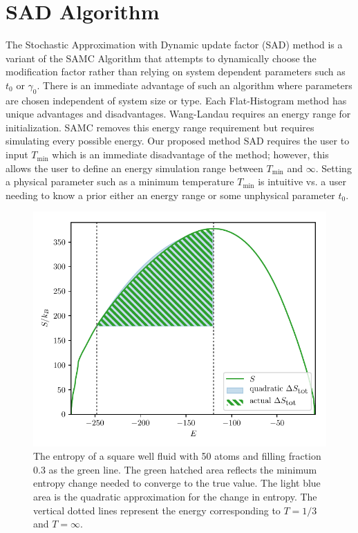 \documentclass[letterpaper,twocolumn,amsmath,amssymb,pre,aps,10pt]{revtex4-1}
\begin{document}
\section{SAD Algorithm}\label{sec:sad}
The Stochastic Approximation with Dynamic update factor (SAD) method
is a variant of the SAMC
Algorithm that attempts to dynamically choose the modification factor
rather than relying on system dependent parameters such as $t_0$ or
$\gamma_0$.  There is an immediate advantage of such an algorithm where
parameters are chosen independent of system size or type. Each
Flat-Histogram method has unique advantages and disadvantages.
Wang-Landau requires an energy range for initialization.  SAMC removes
this energy range requirement but requires simulating every possible
energy. Our proposed method SAD requires the user to input
$T_\text{min}$ which is an immediate disadvantage of the method;
however, this allows the user to define an energy simulation
range between $T_\text{min}$ and $\infty$. Setting a physical parameter
such as a minimum temperature $T_\text{min}$ is intuitive vs. a user
needing to know a prior either an energy range or some unphysical
parameter $t_0$.

\begin{figure}
  \includegraphics[width=\columnwidth]{figs/N50-lndos-comparison}
  \caption{The entropy of a square well fluid with 50 atoms and filling fraction
        0.3 as the green line.  The green hatched area reflects the
        minimum entropy change needed to converge to the true value.
        The light blue area is the quadratic approximation
        for the change in entropy.  The vertical dotted lines represent
        the energy corresponding to $T=1/3$ and $T=\infty$.}
  \label{fig:entropy-cartoon}
\end{figure}
\end{document}
